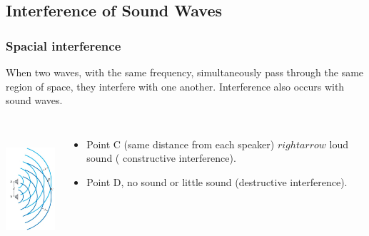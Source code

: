 \documentclass[]{beamer}
\begin{document}
\subsection{Interference of Sound Waves}
\begin{frame}
\frametitle{Spacial interference}

When two waves, with the same frequency, simultaneously pass through the
same region of space, they interfere with one another. Interference also occurs
with sound waves.



  \begin{columns}[c]
   \column{2in}  %
  

  \begin{center}
  \includegraphics[height=1.8in]{images4/soundinterference.jpg}
\end{center}


   \column{2in}

\begin{itemize}
\item  Point C (same distance from each speaker) $rightarrow$ loud sound ( constructive interference).
\pause 

\item Point  D, no sound or  little sound  (destructive interference).
\end{itemize}


   \end{columns}
  \end{frame}








\end{document}
